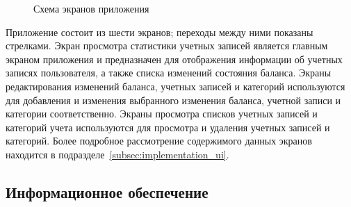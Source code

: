 \begin{figure}[h!]
  \centering
  \caption{Схема экранов приложения}
  \label{fig:design_activities}
\end{figure}

Приложение состоит из шести экранов; переходы между ними показаны стрелками.
Экран просмотра статистики учетных записей является главным экраном приложения
и предназначен для отображения информации об учетных записях пользователя,
а также списка изменений состояния баланса.
Экраны редактирования изменений баланса, учетных записей и категорий
используются для добавления и изменения выбранного изменения баланса,
учетной записи и категории соответственно.
Экраны просмотра списков учетных записей и категорий учета используются
для просмотра и удаления учетных записей и категорий.
Более подробное рассмотрение содержимого данных экранов находится
в подразделе~\ref{subsec:implementation_ui}.

\subsection{Информационное обеспечение}
\label{subsec:design_information}

